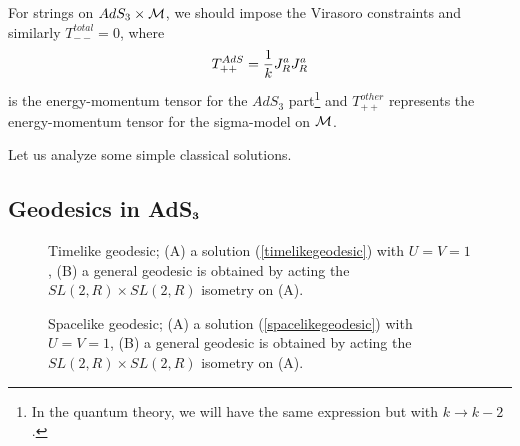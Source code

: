 For strings on $AdS_3 \times {\cal M}$, 
we should impose the Virasoro constraints
and similarly  
$T^{total}_{--} = 0$, where 
$$T_{++}^{AdS}  = { 1 \over k} J^a_R J^a_R$$ 
is the energy-momentum tensor for the $AdS_3$ 
part\footnote{In the quantum
theory,
we will have the same expression but with $k \to k-2$.} 
and $T^{other}_{++}$ represents the energy-momentum tensor
for the sigma-model on ${\cal M}$. 

\medskip


Let us analyze some simple classical solutions. 


\subsection{Geodesics in AdS$_{\bf 3}$}

\begin{figure}[htb]
\begin{center}
\epsfxsize=5.0in\leavevmode{}
\end{center}
\caption{Timelike geodesic; (A) a solution (\ref{timelikegeodesic})
with $U=V=1$, (B) a general geodesic is obtained by acting 
the $SL(2,R) \times SL(2,R)$ isometry on (A).}
\label{GF1}
\end{figure} 

\begin{figure}[htb]
\begin{center}
\epsfxsize=5.0in\leavevmode{}
\end{center}
\caption{Spacelike geodesic; (A) a solution (\ref{spacelikegeodesic})
with $U=V=1$, (B) a general geodesic is obtained by acting 
the $SL(2,R) \times SL(2,R)$ isometry on (A).}
\label{GF2}
\end{figure} 


